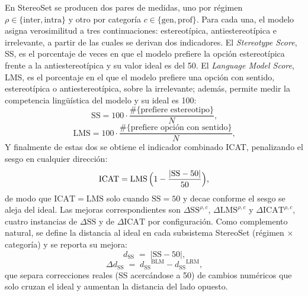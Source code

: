 \documentclass[12pt,a4paper]{report}
\newcommand{\dSS}{\ensuremath{\Delta\mathrm{SS}}}
\newcommand{\dICAT}{\ensuremath{\Delta\mathrm{ICAT}}}
\newcommand{\dLMSp}{\ensuremath{\Delta\mathrm{LMS}}}
\newcommand{\diSS}{\ensuremath{d_{\mathrm{SS}}}}
\begin{document}
En StereoSet se producen dos pares de medidas, uno por régimen $\rho\in\{\mathrm{inter},\mathrm{intra}\}$ y otro por categoría $c\in\{\mathrm{gen},\mathrm{prof}\}$. Para cada una, el modelo asigna verosimilitud a tres continuaciones: estereotípica, antiestereotípica e irrelevante, a partir de las cuales se derivan dos indicadores. El \textit{Stereotype Score}, SS, es el porcentaje de veces en que el modelo prefiere la opción estereotípica frente a la antiestereotípica y su valor ideal es del 50. El \textit{Language Model Score}, LMS, es el porcentaje en el que el modelo prefiere una opción con sentido, estereotípica o antiestereotípica, sobre la irrelevante; además, permite medir la competencia lingüística del modelo y su ideal es 100:
\begin{equation}
\mathrm{SS}=100\cdot\frac{\#\{\text{prefiere estereotipo}\}}{N}\text{,}
\label{eq:ss}
\end{equation}
\begin{equation}
\mathrm{LMS}=100\cdot\frac{\#\{\text{prefiere opción con sentido}\}}{N}\text{,}
\label{eq:lms}
\end{equation}
Y finalmente de estas dos se obtiene el indicador combinado ICAT, penalizando el sesgo en cualquier dirección:
\begin{equation}
\mathrm{ICAT}=\mathrm{LMS}\,\Bigl(1-\frac{|\mathrm{SS}-50|}{50}\Bigr)\text{,}
\label{eq:icat}
\end{equation}
de modo que $\mathrm{ICAT}=\mathrm{LMS}$ solo cuando $\mathrm{SS}=50$ y decae conforme el sesgo se aleja del ideal. Las mejoras correspondientes son $\dSS^{\rho,c}$, $\dLMSp^{\rho,c}$ y $\dICAT^{\rho,c}$, cuatro instancias de $\dSS$ y de $\dICAT$ por configuración. Como complemento natural, se define la distancia al ideal en cada subsistema StereoSet (régimen $\times$ categoría) y se reporta su mejora:
\begin{equation}
\diSS \;=\; |\mathrm{SS}-50|\text{,}
\label{eq:diss}
\end{equation}
\begin{equation}
\Delta\diSS \;=\; \diSS^{\mathrm{BLM}} - \diSS^{\mathrm{LRM}}\text{,}
\label{eq:delta-diss}
\end{equation}
que separa correcciones reales (SS acercándose a 50) de cambios numéricos que solo cruzan el ideal y aumentan la distancia del lado opuesto.
\end{document}
